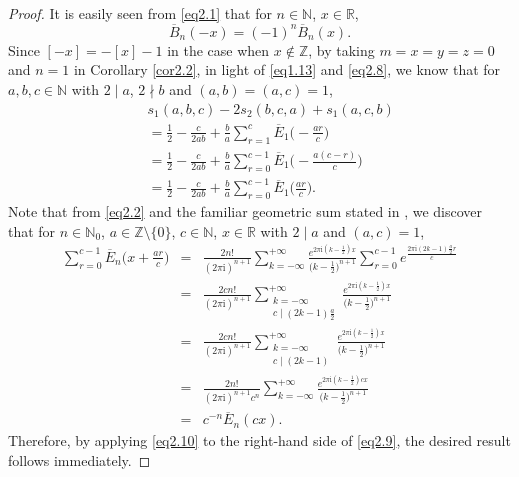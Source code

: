 \documentclass[reqno]{amsart}
\numberwithin{equation}{section}
\begin{document}
\begin{proof}
It is easily seen from \eqref{eq2.1} that for $n\in\mathbb{N}$, $x\in\mathbb{R}$,
\begin{equation}\label{eq2.8}
\overline{B}_{n}(-x)=(-1)^{n}\overline{B}_{n}(x).
\end{equation}
Since $[-x]=-[x]-1$ in the case when $x\not\in\mathbb{Z}$, by taking $m=x=y=z=0$ and $n=1$ in Corollary \ref{cor2.2}, in light of \eqref{eq1.13} and \eqref{eq2.8}, we know that for $a,b,c\in\mathbb{N}$ with $2\mid a$, $2\nmid b$ and $(a,b)=(a,c)=1$,
\begin{eqnarray}\label{eq2.9}
&&s_{1}(a,b,c)-2s_{2}(b,c,a)+s_{1}(a,c,b)\nonumber\\
&&=\frac{1}{2}-\frac{c}{2ab}+\frac{b}{a}\sum_{r=1}^{c}\overline{E}_{1}\biggl(-\frac{ar}{c}\biggl)\nonumber\\
&&=\frac{1}{2}-\frac{c}{2ab}+\frac{b}{a}\sum_{r=0}^{c-1}\overline{E}_{1}\biggl(-\frac{a(c-r)}{c}\biggl)\nonumber\\
&&=\frac{1}{2}-\frac{c}{2ab}+\frac{b}{a}\sum_{r=0}^{c-1}\overline{E}_{1}\biggl(\frac{ar}{c}\biggl).
\end{eqnarray}
Note that from \eqref{eq2.2} and the familiar geometric sum stated in \cite[Theorem 8.1]{apostol1}, we discover that for $n\in\mathbb{N}_{0}$, $a\in\mathbb{Z}\setminus\{0\}$, $c\in\mathbb{N}$, $x\in\mathbb{R}$ with $2\mid a$ and $(a,c)=1$,
\begin{eqnarray}\label{eq2.10}
\sum_{r=0}^{c-1}\overline{E}_{n}\biggl(x+\frac{ar}{c}\biggl)
&=&\frac{2n!}{(2\pi\mathrm{i})^{n+1}}\sum_{k=-\infty}^{+\infty}\frac{e^{2\pi\mathrm{i}(k-\frac{1}{2})x}}{\bigl(k-\frac{1}{2}\bigl)^{n+1}}
\sum_{r=0}^{c-1}e^{\frac{2\pi\mathrm{i}(2k-1)\frac{a}{2}r}{c}}\nonumber\\
&=&\frac{2cn!}{(2\pi\mathrm{i})^{n+1}}\sum_{\substack{k=-\infty\\c\mid(2k-1)\frac{a}{2}}}^{+\infty}\frac{e^{2\pi\mathrm{i}(k-\frac{1}{2})x}}{\bigl(k-\frac{1}{2}\bigl)^{n+1}}\nonumber\\
&=&\frac{2cn!}{(2\pi\mathrm{i})^{n+1}}\sum_{\substack{k=-\infty\\c\mid(2k-1)}}^{+\infty}\frac{e^{2\pi\mathrm{i}(k-\frac{1}{2})x}}{\bigl(k-\frac{1}{2}\bigl)^{n+1}}\nonumber\\
&=&\frac{2n!}{(2\pi\mathrm{i})^{n+1}c^{n}}\sum_{k=-\infty}^{+\infty}\frac{e^{2\pi\mathrm{i}(k-\frac{1}{2})cx}}{\bigl(k-\frac{1}{2}\bigl)^{n+1}}\nonumber\\
&=&c^{-n}\overline{E}_{n}(cx).
\end{eqnarray}
Therefore, by applying \eqref{eq2.10} to the right-hand side of \eqref{eq2.9}, the desired result follows immediately.
\end{proof}
\end{document}
